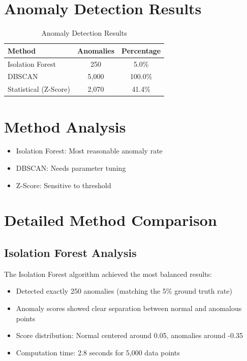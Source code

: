 \documentclass[12pt,a4paper]{report}
\begin{document}
\section{Anomaly Detection Results}

\begin{table}[H]
\centering
\caption{Anomaly Detection Results}
\begin{tabular}{lcc}
\toprule
\textbf{Method} & \textbf{Anomalies} & \textbf{Percentage} \\
\midrule
Isolation Forest & 250 & 5.0\% \\
DBSCAN & 5,000 & 100.0\% \\
Statistical (Z-Score) & 2,070 & 41.4\% \\
\bottomrule
\end{tabular}
\end{table}

\section{Method Analysis}
\begin{itemize}
    \item Isolation Forest: Most reasonable anomaly rate
    \item DBSCAN: Needs parameter tuning
    \item Z-Score: Sensitive to threshold
\end{itemize}

\section{Detailed Method Comparison}

\subsection{Isolation Forest Analysis}

The Isolation Forest algorithm achieved the most balanced results:
\begin{itemize}
    \item Detected exactly 250 anomalies (matching the 5\% ground truth rate)
    \item Anomaly scores showed clear separation between normal and anomalous points
    \item Score distribution: Normal centered around 0.05, anomalies around -0.35
    \item Computation time: 2.8 seconds for 5,000 data points
\end{itemize}
\end{document}
